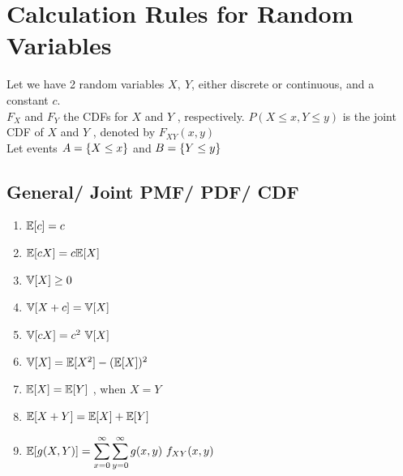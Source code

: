 \section{Calculation Rules for Random Variables}

Let we have 2 random variables $X, \ Y$, either discrete or continuous, and a constant $c$.
\\
$F _X$ and $F_Y$ the CDFs for $X$ and $Y$ , respectively. $P(X \leq x, Y \leq y)$ is the joint CDF
of $X$ and $Y$ , denoted by $F _{X Y} (x, y)$
\\
Let events $A = \left\{X \leq x\right\}$ and $B = \left\{Y \leq y\right\}$

\subsection{General/ Joint PMF/ PDF/ CDF}

\begin{multicols}{2}
\begin{enumerate}[series=calcrulesrv]
    \item $\mathbb{E}[c] = c$
    \hfill \cite{statistics/book/Statistics-for-Data-Scientists/Maurits-Kaptein}

    \item $\mathbb{E}[cX] = c \mathbb{E}[X]$
    \hfill \cite{statistics/book/Statistics-for-Data-Scientists/Maurits-Kaptein}

    \item $\mathbb{V}[X] \geq 0$
    \hfill \cite{statistics/book/Statistics-for-Data-Scientists/Maurits-Kaptein}

    \item $\mathbb{V}[X + c] = \mathbb{V}[X]$
    \hfill \cite{statistics/book/Statistics-for-Data-Scientists/Maurits-Kaptein}

    \item $\mathbb{V}[cX] = c^2\ \mathbb{V}[X]$
    \hfill \cite{statistics/book/Statistics-for-Data-Scientists/Maurits-Kaptein}

    \item $\mathbb{V}[X] = \mathbb{E}[X^2] - (\mathbb{E}[X])^2$
    \hfill \cite{statistics/book/Statistics-for-Data-Scientists/Maurits-Kaptein}

    \item $\mathbb{E}[X] = \mathbb{E}[Y]$ , when $X = Y$
    \hfill \cite{statistics/book/Statistics-for-Data-Scientists/Maurits-Kaptein}

    \item $\mathbb{E}[X + Y] = \mathbb{E}[X] + \mathbb{E}[Y]$
    \hfill \cite{statistics/book/Statistics-for-Data-Scientists/Maurits-Kaptein}

    \item $\mathbb{E}[g(X, Y )] = \displaystyle\sum^\infty_{x=0} \displaystyle\sum^\infty_{y=0} g(x, y)\ f_{X Y} (x, y)$
    \hfill \cite{statistics/book/Statistics-for-Data-Scientists/Maurits-Kaptein}
\end{enumerate}
\end{multicols}

